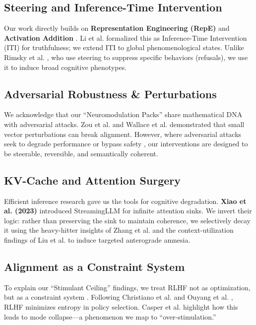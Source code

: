 \documentclass[10pt, twocolumn]{article}
\begin{document}
\subsection{Steering and Inference-Time Intervention}
Our work directly builds on \textbf{Representation Engineering (RepE)} \cite{zou2023_repe} and \textbf{Activation Addition} \cite{turner2023}. Li et al. \cite{li2023_iti} formalized this as Inference-Time Intervention (ITI) for truthfulness; we extend ITI to global phenomenological states. Unlike Rimsky et al. \cite{rimsky2023}, who use steering to suppress specific behaviors (refusals), we use it to induce broad cognitive phenotypes.

\subsection{Adversarial Robustness \& Perturbations}
We acknowledge that our ``Neuromodulation Packs'' share mathematical DNA with adversarial attacks. Zou et al. \cite{zou2023_attacks} and Wallace et al. \cite{wallace2019} demonstrated that small vector perturbations can break alignment. However, where adversarial attacks seek to degrade performance or bypass safety \cite{carlini2024}, our interventions are designed to be steerable, reversible, and semantically coherent.

\subsection{KV-Cache and Attention Surgery}
Efficient inference research gave us the tools for cognitive degradation. \textbf{Xiao et al. (2023)} introduced StreamingLLM \cite{xiao2023} for infinite attention sinks. We invert their logic: rather than preserving the sink to maintain coherence, we selectively decay it using the heavy-hitter insights of Zhang et al. \cite{zhang2024} and the context-utilization findings of Liu et al. \cite{liu2023_lost} to induce targeted anterograde amnesia.

\subsection{Alignment as a Constraint System}
To explain our ``Stimulant Ceiling'' findings, we treat RLHF not as optimization, but as a constraint system \cite{rafailov2023}. Following Christiano et al. \cite{christiano2017} and Ouyang et al. \cite{ouyang2022}, RLHF minimizes entropy in policy selection. Casper et al. \cite{casper2023} highlight how this leads to mode collapse—a phenomenon we map to ``over-stimulation.''
\end{document}
